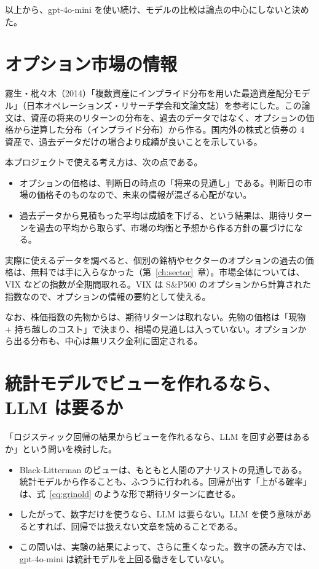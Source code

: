 \documentclass[xelatex,ja=standard,jafont=hiragino-pron,a4paper,10pt]{bxjsreport}
\newcommand{\SP}{S\&P500}
\newcommand{\chapref}[1]{第~\ref{#1}~章}
\begin{document}
以上から、gpt-4o-mini を使い続け、モデルの比較は論点の中心にしないと決めた。

\section{オプション市場の情報}

霧生・枇々木（2014）「複数資産にインプライド分布を用いた最適資産配分モデル」（日本オペレーションズ・リサーチ学会和文論文誌）を参考にした。この論文は、資産の将来のリターンの分布を、過去のデータではなく、オプションの価格から逆算した分布（インプライド分布）から作る。国内外の株式と債券の 4 資産で、過去データだけの場合より成績が良いことを示している。

本プロジェクトで使える考え方は、次の点である。

\begin{itemize}
\item オプションの価格は、判断日の時点の「将来の見通し」である。判断日の市場の価格そのものなので、未来の情報が混ざる心配がない。
\item 過去データから見積もった平均は成績を下げる、という結果は、期待リターンを過去の平均から取らず、市場の均衡と予想から作る方針の裏づけになる。
\end{itemize}

実際に使えるデータを調べると、個別の銘柄やセクターのオプションの過去の価格は、無料では手に入らなかった（\chapref{ch:sector}）。市場全体については、VIX などの指数が全期間取れる。VIX は \SP{} のオプションから計算された指数なので、オプションの情報の要約として使える。

なお、株価指数の先物からは、期待リターンは取れない。先物の価格は「現物 $+$ 持ち越しのコスト」で決まり、相場の見通しは入っていない。オプションから出る分布も、中心は無リスク金利に固定される。

\section{統計モデルでビューを作れるなら、LLM は要るか}

「ロジスティック回帰の結果からビューを作れるなら、LLM を回す必要はあるか」という問いを検討した。

\begin{itemize}
\item Black-Litterman のビューは、もともと人間のアナリストの見通しである。統計モデルから作ることも、ふつうに行われる。回帰が出す「上がる確率」は、式~\eqref{eq:grinold} のような形で期待リターンに直せる。
\item したがって、数字だけを使うなら、LLM は要らない。LLM を使う意味があるとすれば、回帰では扱えない文章を読めることである。
\item この問いは、実験の結果によって、さらに重くなった。数字の読み方では、gpt-4o-mini は統計モデルを上回る働きをしていない。
\end{itemize}
\end{document}
